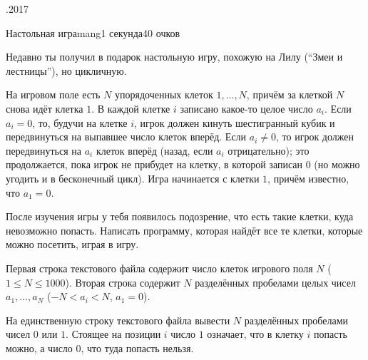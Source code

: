 \documentclass[a4paper,11pt]{article}
\begin{document}
\begin{ol}{\eio}{.2017}{\yle}{}
\begin{yl}{3}{Настольная игра}{mang}{1 секунда}{40 очков}

Недавно ты получил в подарок настольную игру, похожую на Лилу (``Змеи и лестницы''), но цикличную.

На игровом поле есть $N$ упорядоченных клеток $1, \ldots, N$, причём за клеткой $N$ снова идёт клетка $1$. В каждой клетке $i$ записано какое-то целое число $a_i$. Если $a_i = 0$, то, будучи на клетке $i$, игрок должен кинуть шестигранный кубик и передвинуться на выпавшее число клеток вперёд. Если $a_i \ne 0$, то игрок должен передвинуться на $a_i$ клеток вперёд (назад, если $a_i$ отрицательно); это продолжается, пока игрок не прибудет на клетку, в которой записан $0$ (но можно угодить и в бесконечный цикл). Игра начинается с клетки $1$, причём известно, что $a_1 = 0$.

После изучения игры у тебя появилось подозрение, что есть такие клетки, куда невозможно попасть. Написать программу, которая найдёт все те клетки, которые можно посетить, играя в игру.

\sis Первая строка текстового файла \sisf содержит число клеток игрового поля $N$ ($1 \le N \le 1000$).
Вторая строка содержит $N$ разделённых пробелами целых чисел $a_1, \ldots, a_N$ ($-N < a_i < N$, $a_1 = 0$).

\val На единственную строку текстового файла \valf вывести $N$ разделённых пробелами чисел $0$ или $1$. Стоящее на позиции $i$ число $1$ означает, что в клетку $i$ попасть можно, а число $0$, что туда попасть нельзя.

\nde[0]{5cm}{5cm}

\nde[1]{5cm}{5cm}

\end{yl}
\end{ol}
\end{document}
